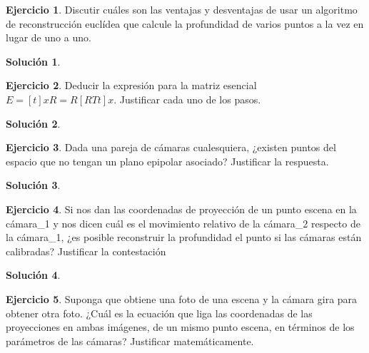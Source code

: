 \documentclass[a4paper, 11pt]{article}
\theoremstyle{definition}
\newtheorem{ejercicio}{Ejercicio}
\newtheorem*{solucion}{Solución}
\theoremstyle{theorem}
\begin{document}
    \begin{ejercicio}
        Discutir cuáles son las ventajas y desventajas de usar un algoritmo de reconstrucción euclídea que calcule la profundidad de varios puntos a la vez en lugar de uno a uno.
    \end{ejercicio}

    \begin{solucion}

    \end{solucion}

    \begin{ejercicio}
        Deducir la expresión para la matriz esencial $E = [t]x R = R[RTt]x$. Justificar cada uno de los pasos.
    \end{ejercicio}

    \begin{solucion}

    \end{solucion}

    \begin{ejercicio}
        Dada una pareja de cámaras cualesquiera, ¿existen puntos del espacio que no tengan un plano epipolar asociado? Justificar la respuesta.
    \end{ejercicio}

    \begin{solucion}

    \end{solucion}

    \begin{ejercicio}
        Si nos dan las coordenadas de proyección de un punto escena en la cámara\_1 y nos dicen cuál es el movimiento relativo de la cámara\_2 respecto de la cámara\_1, ¿es posible reconstruir la profundidad el punto si las cámaras están calibradas? Justificar la contestación
    \end{ejercicio}

    \begin{solucion}

    \end{solucion}

    \begin{ejercicio}
        Suponga que obtiene una foto de una escena y la cámara gira para obtener otra foto. ¿Cuál es la ecuación que liga las coordenadas de las proyecciones en ambas imágenes, de un mismo punto escena, en términos de los parámetros de las cámaras? Justificar matemáticamente.
    \end{ejercicio}
\end{document}
